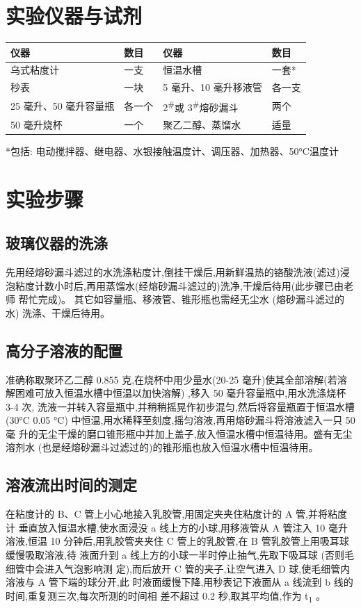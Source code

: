 \documentclass[11pt]{report}
\begin{document}
\chapter{实验仪器与试剂}
\label{sec:org093d15f}
\begin{center}
\begin{tabular}{llll}
仪器 & 数目 & 仪器 & 数目\\
\hline
乌式粘度计 & 一支 & 恒温水槽 & 一套*\\
秒表 & 一块 & 5 毫升、10 毫升移液管 & 各一支\\
25 毫升、50 毫升容量瓶 & 各一个 & 2\textsuperscript{\#}或 3\textsuperscript{\#}熔砂漏斗 & 两个\\
50 毫升烧杯 & 一个 & 聚乙二醇、蒸馏水 & 适量\\
\end{tabular}
\end{center}

*包括: 电动搅拌器、继电器、水银接触温度计、调压器、加热器、50°C温度计

\chapter{实验步骤}
\label{sec:orgefbdd6b}
\section{玻璃仪器的洗涤}
\label{sec:orga090501}
先用经熔砂漏斗滤过的水洗涤粘度计,倒挂干燥后,用新鲜温热的铬酸洗液(滤过)浸
泡粘度计数小时后,再用蒸馏水(经熔砂漏斗滤过的)洗净,干燥后待用(此步骤已由老师
帮忙完成)。
其它如容量瓶、移液管、锥形瓶也需经无尘水
 (熔砂漏斗滤过的水) 洗涤、干燥后待用。
\section{高分子溶液的配置}
\label{sec:org0b7ef3e}
准确称取聚环乙二醇 0.855 克,在烧杯中用少量水(20-25 毫升)使其全部溶解(若溶
解困难可放入恒温水槽中恒温以加快溶解)
 ,移入 50 毫升容量瓶中,用水洗涤烧杯 3-4 次,
洗液一并转入容量瓶中,并稍稍摇晃作初步混匀,然后将容量瓶置于恒温水槽
(30°C\textpm{} 0.05 °C) 中恒温,用水稀释至刻度,摇匀溶液,再用熔砂漏斗将溶液滤入一只 50 毫
升的无尘干燥的磨口锥形瓶中并加上盖子,放入恒温水槽中恒温待用。盛有无尘溶剂水
(也是经熔砂漏斗过滤过的)的锥形瓶也放入恒温水槽中恒温待用。
\section{溶液流出时间的测定}
\label{sec:org6e11f5b}
在粘度计的 B、C 管上小心地接入乳胶管,用固定夹夹住粘度计的 A 管,并将粘度计
垂直放入恒温水槽,使水面浸没 a 线上方的小球,用移液管从 A 管注入 10 毫升溶液,恒温
10 分钟后,用乳胶管夹夹住 C 管上的乳胶管,在 B 管乳胶管上用吸耳球缓慢吸取溶液,待
液面升到 a 线上方的小球一半时停止抽气,先取下吸耳球 (否则毛细管中会进入气泡影响测
定),而后放开 C 管的夹子,让空气进入 D 球,使毛细管内溶液与 A 管下端的球分开,此
时液面缓慢下降,用秒表记下液面从 a 线流到 b 线的时间,重复测三次,每次所测的时间相
差不超过 0.2 秒,取其平均值,作为 t\textsubscript{1} 。
\end{document}
